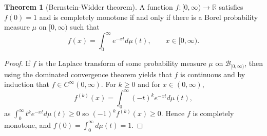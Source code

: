 \documentclass{article}
\theoremstyle{definition}
\newtheorem{theorem}{Theorem}
\theoremstyle{definition}
\begin{document}
\begin{theorem}[Bernstein-Widder theorem]
A function $f:[0,\infty) \to \mathbb{R}$ satisfies $f(0)=1$ and is completely monotone if and only if
there is a Borel probability measure $\mu$ on $[0,\infty)$ such that
\[
f(x) = \int_0^\infty e^{-xt} d\mu(t),\qquad x \in [0,\infty).
\]
\label{bernstein}
\end{theorem}
\begin{proof}
If $f$ is the Laplace transform of some probability measure $\mu$ on $\mathscr{B}_{[0,\infty)}$,
then using the dominated convergence theorem yields that $f$ is continuous and by induction that
$f \in C^\infty(0,\infty)$. For $k \geq 0$ and for $x \in (0,\infty)$,
\[
f^{(k)}(x) = \int_0^\infty (-t)^k e^{-xt} d\mu(t),
\]
as $\int_0^\infty t^k e^{-xt} d\mu(t) \geq 0$ so $(-1)^k f^{(k)}(x) \geq 0$. Hence $f$ is completely monotone,
and $f(0)=\int_0^\infty d\mu(t)=1$. 


\end{proof}
\end{document}
